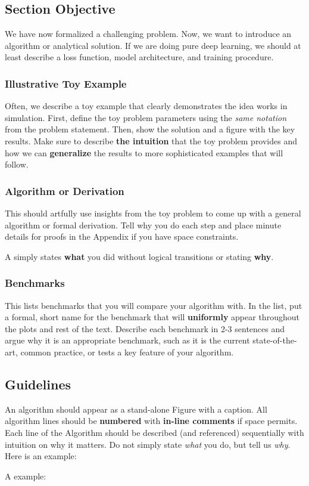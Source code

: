 \subsection{Section Objective}
We have now formalized a challenging problem. Now, we want to introduce an algorithm or analytical solution. If we are doing pure deep learning, we should at least describe a loss function, model architecture, and training procedure. 

\subsubsection{Illustrative Toy Example}
Often, we describe a toy example that clearly demonstrates the idea works in simulation. First, define the toy problem parameters using the \textit{same notation} from the problem statement. Then, show the solution and a figure with the key results. Make sure to describe \textbf{the intuition} that the toy problem provides and how we can \textbf{generalize} the results to more sophisticated examples that will follow.

\subsubsection{Algorithm or Derivation}
This should artfully use insights from the toy problem to come up with a general algorithm or formal derivation. Tell why you do each step and place minute details for proofs in the Appendix if you have space constraints. 

A  simply states \textbf{what} you did without logical transitions or stating \textbf{why}.

\subsubsection{Benchmarks}
This lists benchmarks that you will compare your algorithm with. In the list, put a formal, short name for the benchmark that will \textbf{uniformly} appear throughout the plots and rest of the text. Describe each benchmark in 2-3 sentences and argue why it is an appropriate benchmark, such as it is the current state-of-the-art, common practice, or tests a key feature of your algorithm.

\subsection{Guidelines}
An algorithm should appear as a stand-alone Figure with a caption. 
All algorithm lines should be \textbf{numbered} with \textbf{in-line comments} if space permits. Each line of the Algorithm should be described (and referenced) sequentially with intuition on why it matters. Do not simply state \textit{what} you do, but tell us \textit{why}. Here is an example: 

A  example: 
\begin{quote}
\end{quote}
